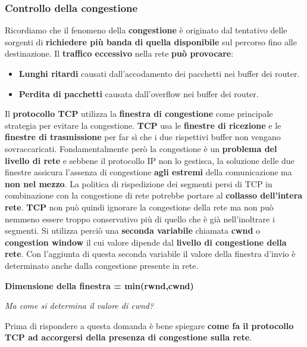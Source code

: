 \documentclass[11pt,a4paper,oneside]{book}
\theoremstyle{definition}
\begin{document}
\pagebreak

\subsubsection{Controllo della congestione}
Ricordiamo che il fenomeno della \textbf{congestione} è originato dal tentativo delle
sorgenti di \textbf{richiedere più banda di quella disponibile} sul percorso fino alle destinazione.\newline
Il \textbf{traffico eccessivo} nella rete \textbf{può provocare}:
\begin{itemize}
	\item \textbf{Lunghi ritardi} causati dall'accodamento dei pacchetti nei buffer dei router.
	\item \textbf{Perdita di pacchetti} causata dall'overflow nei buffer dei router.
\end{itemize}
Il \textbf{protocollo TCP} utilizza la \textbf{finestra di congestione} come principale strategia per evitare la congestione.\newline\newline
\textbf{TCP} usa le \textbf{finestre di ricezione} e le \textbf{finestre di trasmissione} per far sì che i due rispettivi buffer non vengano sovraccaricati. Fondamentalmente però la congestione è un \textbf{problema del livello di rete} e sebbene il protocollo IP non lo gestisca, la soluzione delle due finestre assicura l'assenza di congestione \textbf{agli estremi} della comunicazione ma \textbf{non nel mezzo}. La politica di rispedizione dei segmenti persi di TCP in combinazione con la congestione di rete potrebbe portare al \textbf{collasso dell'intera rete}.
\textbf{TCP} non può quindi ignorare la congestione della rete ma non può nemmeno essere troppo conservativo più di quello che è già nell'inoltrare i segmenti. Si utilizza perciò una \textbf{seconda variabile} chiamata \textbf{cwnd} o \textbf{congestion window} il cui valore dipende dal \textbf{livello di congestione della rete}. Con l'aggiunta di questa seconda variabile il valore della finestra d'invio è determinato anche dalla congestione presente in rete.
\begin{center}
	\textbf{Dimensione della finestra = min(rwnd,cwnd)}
\end{center}
\begin{flushleft}
	\textit{Ma come si determina il valore di cwnd?}
\end{flushleft}
Prima di rispondere a questa domanda è bene spiegare \textbf{come fa il protocollo TCP ad accorgersi della presenza di congestione sulla rete}.
\end{document}
